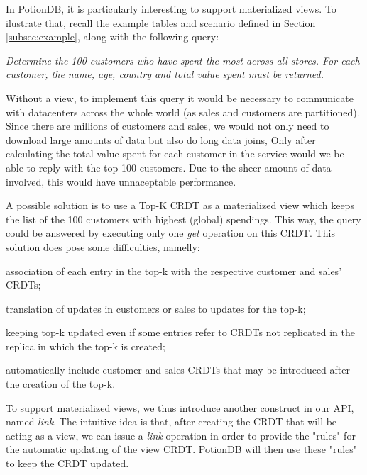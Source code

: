 \documentclass{vldb}
\begin{document}
In PotionDB, it is particularly interesting to support materialized views.
To ilustrate that, recall the example tables and scenario defined in Section \ref{subsec:example}, along with the following query: 

\emph{Determine the 100 customers who have spent the most across all stores. For each customer, the name, age, country and total value spent must be returned.}

Without a view, to implement this query it would be necessary to communicate with datacenters across the whole world (as sales and customers are partitioned). 
Since there are millions of customers and sales, we would not only need to download large amounts of data but also do long data joins,
Only after calculating the total value spent for each customer in the service would we be able to reply with the top 100 customers.
Due to the sheer amount of data involved, this would have unnaceptable performance.

A possible solution is to use a Top-K CRDT %
as a materialized view which keeps the list of the 100 customers with highest (global) spendings.
This way, the query could be answered by executing only one \emph{get} operation on this CRDT.
This solution does pose some difficulties, namelly: 
\begin{enumerate*}[label=(\roman*)]
	\item association of each entry in the top-k with the respective customer and sales' CRDTs;
	\item translation of updates in customers or sales to updates for the top-k;
	\item keeping top-k updated even if some entries refer to CRDTs not replicated in the replica in which the top-k is created;
	\item automatically include customer and sales CRDTs that may be introduced after the creation of the top-k.
\end{enumerate*}

To support materialized views, we thus introduce another construct in our API, named \emph{link}.
The intuitive idea is that, after creating the CRDT that will be acting as a view, we can issue a \emph{link} operation in order to provide the "rules" for the automatic updating of the view CRDT.
PotionDB will then use these "rules" to keep the CRDT updated.
\end{document}
